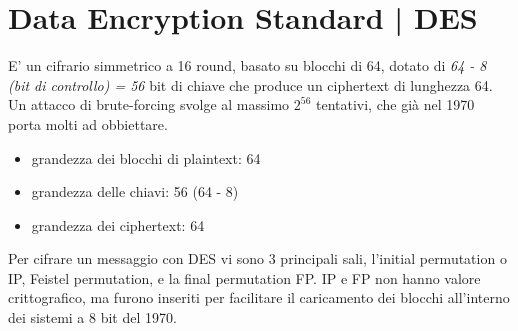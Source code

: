 \documentclass[11pt, oneside]{article}   	%
\begin{document}
\section*{Data Encryption Standard | DES}
E' un cifrario simmetrico a 16 round, basato su blocchi di 64, dotato di \emph{64 - 8 (bit di controllo) = 56} bit di chiave che produce un ciphertext di lunghezza 64. Un attacco di brute-forcing svolge al massimo $2^{56}$ tentativi, che già nel 1970 porta molti ad obbiettare.
\begin{itemize}
\item grandezza dei blocchi di plaintext: 64
\item grandezza delle chiavi: 56 (64 - 8)
\item grandezza dei ciphertext: 64
\end{itemize}
Per cifrare un messaggio con DES vi sono 3 principali sali, l'initial permutation o IP, Feistel permutation, e la final permutation FP. IP e FP non hanno valore crittografico, ma furono inseriti per facilitare il caricamento dei blocchi all'interno dei sistemi a 8 bit del 1970.
\end{document}
